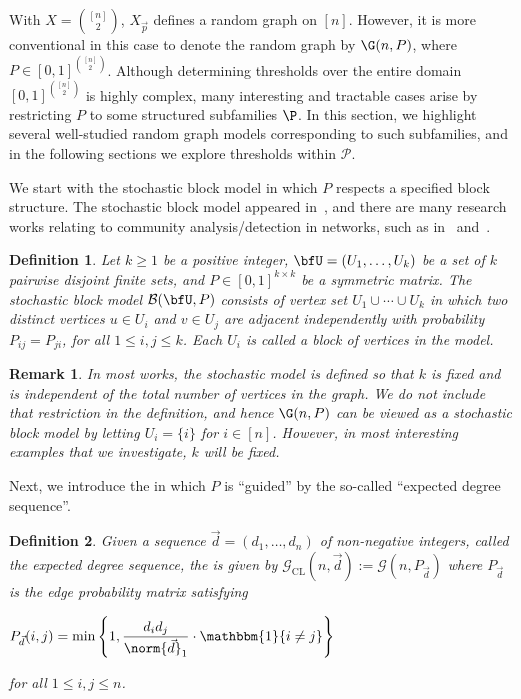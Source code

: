 \documentclass[12pt]{article}
\newtheorem*{definition*}{Definition}
\newtheorem*{remark*}{Remark}
\begin{document}
With $X=\binom{[n]}{2}$, $X_{\vec{p}}$ defines a random graph on $[n]$. However, it is more conventional in this case to denote the random graph by $\G(n,P)$, where $P\in [0,1]^{\binom{[n]}{2}}$. Although determining thresholds over the entire domain $[0,1]^{\binom{[n]}{2}}$
is highly complex, many interesting and tractable cases arise by restricting $P$ to some structured subfamilies $\P$. In this section, we highlight several well-studied random graph models corresponding to such subfamilies, and in the following sections we explore thresholds within ${\mathcal P}$.

We start with the stochastic block model in which $P$ respects a specified block structure. The stochastic block model appeared in~\cite{SBM_Intro}, and there are many research works relating to community analysis/detection in networks, such as in~\cite{SBM_First_Community_Detection} and~\cite{SBM_Second_Community_Detection}. 

\begin{definition*} Let $k\ge 1$ be a positive integer, $\bfU=(U_1,\ldots, U_k)$ be a set of $k$ pairwise disjoint finite sets, and $P\in [0,1]^{k\times k}$ be a symmetric matrix. 
The stochastic block model $\mathcal{B}(\bfU, P)$ consists of vertex set $U_1\cup\cdots\cup U_k$ in which two distinct vertices $u\in U_i$ and $v\in U_j$ are adjacent independently with probability $P_{ij} = P_{ji}$, for all $1\leq i,j\leq k$. Each $U_i$ is called a block of vertices in the model.
\end{definition*}

\begin{remark*}
\normalfont
In most works, the stochastic model is defined so that $k$ is fixed and is independent of the total number of vertices in the graph. We do not include that restriction in the definition, and hence $\G(n,P)$ can be viewed as a stochastic block model by letting $U_i=\{i\}$ for $i\in [n]$. However, in  most interesting examples that we investigate, $k$ will be fixed.
\end{remark*}

Next, we introduce the  in which $P$ is ``guided'' by the so-called ``expected degree sequence''.

\begin{definition*}
Given a sequence $\vec{d} = (d_1,\ldots,d_n)$ of non-negative integers, called the expected degree sequence, the  is given by $\mathcal{G}_{\text{CL}}(n,\vec{d}) := \mathcal{G}(n, P_{\vec{d}})$ where $P_{\vec{d}}$ is the edge probability matrix satisfying
\begin{center}
    $P_{\vec{d}}(i,j) = \min\left\{1, \displaystyle\frac{d_i d_j}{\norm{\vec{d}}_1}\cdot\mathbbm{1}\{i\neq j\}\right\}$
\end{center}
for all $1\leq i,j\leq n$.
\end{definition*}
\end{document}
